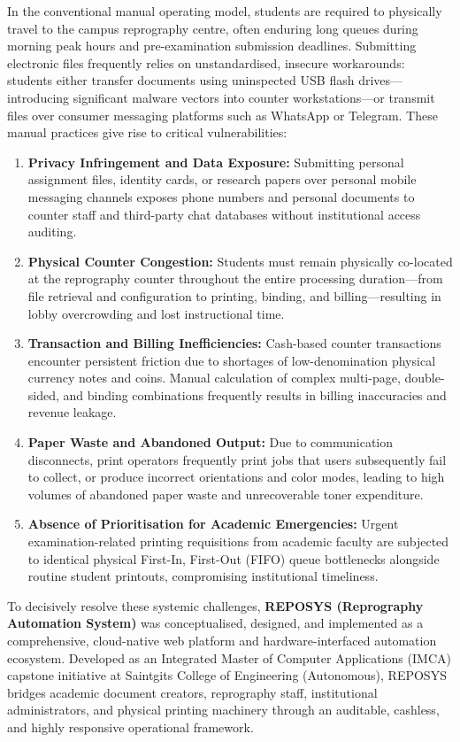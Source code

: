 \documentclass[12pt,a4paper,oneside]{report}
\begin{document}
In the conventional manual operating model, students are required to physically travel to the campus reprography centre, often enduring long queues during morning peak hours and pre-examination submission deadlines. Submitting electronic files frequently relies on unstandardised, insecure workarounds: students either transfer documents using uninspected USB flash drives---introducing significant malware vectors into counter workstations---or transmit files over consumer messaging platforms such as WhatsApp or Telegram. These manual practices give rise to critical vulnerabilities:
\begin{enumerate}[leftmargin=0.35in, itemsep=2pt]
  \item \textbf{Privacy Infringement and Data Exposure:} Submitting personal assignment files, identity cards, or research papers over personal mobile messaging channels exposes phone numbers and personal documents to counter staff and third-party chat databases without institutional access auditing.
  \item \textbf{Physical Counter Congestion:} Students must remain physically co-located at the reprography counter throughout the entire processing duration---from file retrieval and configuration to printing, binding, and billing---resulting in lobby overcrowding and lost instructional time.
  \item \textbf{Transaction and Billing Inefficiencies:} Cash-based counter transactions encounter persistent friction due to shortages of low-denomination physical currency notes and coins. Manual calculation of complex multi-page, double-sided, and binding combinations frequently results in billing inaccuracies and revenue leakage.
  \item \textbf{Paper Waste and Abandoned Output:} Due to communication disconnects, print operators frequently print jobs that users subsequently fail to collect, or produce incorrect orientations and color modes, leading to high volumes of abandoned paper waste and unrecoverable toner expenditure.
  \item \textbf{Absence of Prioritisation for Academic Emergencies:} Urgent examination-related printing requisitions from academic faculty are subjected to identical physical First-In, First-Out (FIFO) queue bottlenecks alongside routine student printouts, compromising institutional timeliness.
\end{enumerate}

To decisively resolve these systemic challenges, \textbf{REPOSYS (Reprography Automation System)} was conceptualised, designed, and implemented as a comprehensive, cloud-native web platform and hardware-interfaced automation ecosystem. Developed as an Integrated Master of Computer Applications (IMCA) capstone initiative at Saintgits College of Engineering (Autonomous), REPOSYS bridges academic document creators, reprography staff, institutional administrators, and physical printing machinery through an auditable, cashless, and highly responsive operational framework.
\end{document}
